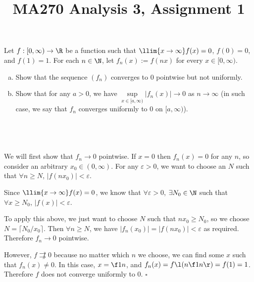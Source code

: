 \documentclass[a4paper]{article}
\title{MA270 Analysis 3, Assignment 1}
\begin{document}
\maketitle

\setlength{\parindent}{0em}
\setlength{\parskip}{1em}


\begin{questionbody}
Let $f : [0, \infty) \to \R$ be a function such that $\llim{x \to \infty} f(x) = 0$, $f(0) = 0$, and $f(1) = 1$. For each $n \in \N$, let $f_n(x) := f(nx)$ for every $x \in [0, \infty)$. %
%
\begin{enumerate}[(a)]
    \item Show that the sequence $(f_n)$ converges to 0 pointwise but not uniformly.
    \item Show that for any $a > 0$, we have $\sup\limits_{x \in [a, \infty)} |f_n(x)| \to 0$ as $n \to \infty$ (in such case, we say that $f_n$ converges uniformly to 0 on $[a, \infty)$). %
\end{enumerate}
\end{questionbody}

\subsection{~} %

We will first show that $f_n \to 0$ pointwise. If $x = 0$ then $f_n(x) = 0$ for any $n$, so consider an arbitrary $x_0 \in (0, \infty)$. For any $\varepsilon > 0$, we want to choose an $N$ such that $\forall n \ge N$, $|f(n x_0)| < \varepsilon$.

Since $\llim{x \to \infty} f(x) = 0$, we know that $\forall \varepsilon > 0$, $\exists N_0 \in \N$ such that $\forall x \ge N_0$, $|f(x)| < \varepsilon$.

To apply this above, we just want to choose $N$ such that $n x_0 \ge N_0$, so we choose $N = \lceil N_0 / x_0 \rceil$. Then $\forall n \ge N$, we have $|f_n(x_0)| = |f(n x_0)| < \varepsilon$ as required. Therefore $f_n \to 0$ pointwise.

However, $f \not\rightrightarrows 0$ because no matter which $n$ we choose, we can find some $x$ such that $f_n(x) \ne 0$. In this case, $x = \f1n$, and $f_n(x) = f\l(n \f1n\r) = f(1) = 1$. Therefore $f$ does not converge uniformly to 0.
\hfill$\square$

\subsection{~} %
\end{document}
